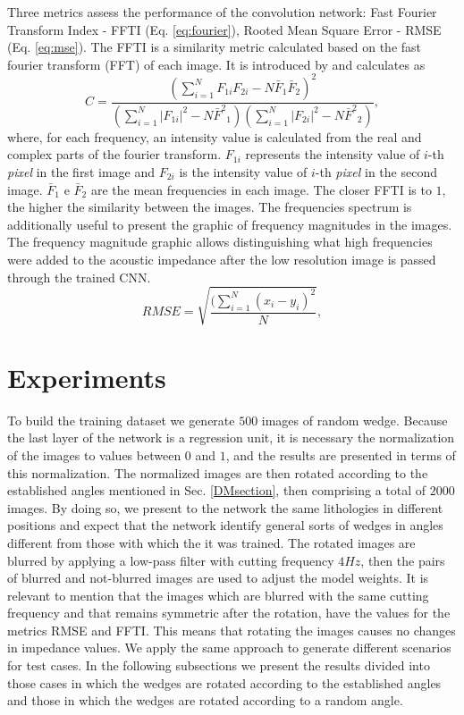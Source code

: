 \documentclass[conference,compsoc]{IEEEtran}
\begin{document}
Three metrics assess the performance of the convolution network: Fast Fourier Transform Index - FFTI (Eq. \ref{eq:fourier}),
Rooted Mean Square Error - RMSE (Eq. \ref{eq:mse}). 
The FFTI is a similarity metric calculated based on the fast fourier transform (FFT) of each image.
It is introduced by \cite{naranyana} and calculates as 
\begin{equation}
 C = \frac{ (\sum_{i=1}^{N}{F_{1i}F_{2i}} - N \bar{F}_1\bar{F}_2 )^2 }{ (\sum_{i=1}^{N}{|F_{1i}|^2} - N{\bar{F}^2}_1)( \sum_{i=1}^{N}{|F_{2i}|^2} - N{\bar{F}^2}_2 )},
 \label{eq:fourier}
\end{equation}
where, for each frequency, an intensity value is calculated from the real and complex parts of the fourier
transform. $F_{1i}$ represents the intensity value of $i$-th \textit{pixel} in the first image and $F_{2i}$
is the intensity value of $i$-th \textit{pixel} in the second image. $\bar{F}_1$ e $\bar{F}_2$ are the mean
frequencies in each image. The closer FFTI is to $1$, the higher the similarity between the images.
The frequencies spectrum is additionally useful to present the graphic of frequency magnitudes in the images.
The frequency magnitude graphic allows distinguishing what high frequencies were added to the acoustic impedance
after the low resolution image is passed through the trained CNN. 
\begin{equation}
 RMSE = \sqrt{\frac{ (\sum_{i=1}^{N}{(x_i -y_i)^2 } }{N}},
 \label{eq:mse}
\end{equation}

\section{Experiments}
To build the training dataset we generate $500$ images of random wedge.
Because the last layer of the network is a regression unit, it is necessary the
normalization of the images to values between $0$ and $1$, and the results
are presented in terms of this normalization.
The normalized images are then rotated according to the established angles mentioned in Sec. \ref{DMsection},
then comprising a total of $2000$ images. By doing so, we present to
the network the same lithologies in different positions and expect that the network
identify general sorts of wedges in angles different from those with which the it was trained.
The rotated images are blurred by applying a low-pass filter with
cutting frequency $4Hz$, then the pairs of blurred and not-blurred images are used to
adjust the model weights. It is relevant to mention that the images which are blurred with
the same cutting frequency and that remains symmetric after the rotation,
have the values for the metrics RMSE and FFTI. This means that rotating the images causes no changes in impedance values.
We apply the same approach to generate different scenarios for test cases.
In the following subsections we present the results divided into those cases in which the wedges are
rotated according to the established angles and those in which the wedges are rotated according
to a random angle.
\end{document}

